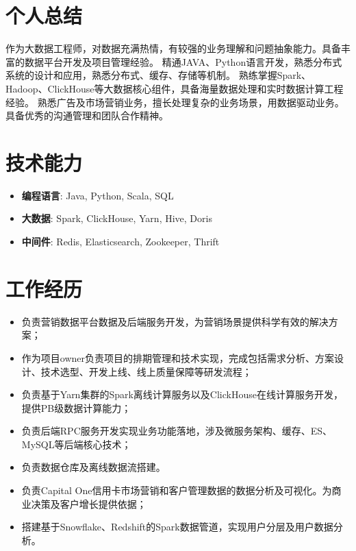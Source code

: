 \documentclass{resume}
\begin{document}

 
\section{个人总结}
作为大数据工程师，对数据充满热情，有较强的业务理解和问题抽象能力。具备丰富的数据平台开发及项目管理经验。
精通JAVA、Python语言开发，熟悉分布式系统的设计和应用，熟悉分布式、缓存、存储等机制。
熟练掌握Spark、Hadoop、ClickHouse等大数据核心组件，具备海量数据处理和实时数据计算工程经验。
熟悉广告及市场营销业务，擅长处理复杂的业务场景，用数据驱动业务。
具备优秀的沟通管理和团队合作精神。

\section{技术能力}
\begin{itemize}[parsep=0.2ex]
  \item \textbf{编程语言}: Java, Python, Scala, SQL
  \item \textbf{大数据}: Spark, ClickHouse, Yarn, Hive, Doris
  \item \textbf{中间件}: Redis, Elasticsearch, Zookeeper, Thrift
\end{itemize}

\section{工作经历}
\begin{itemize}
  \item 负责营销数据平台数据及后端服务开发，为营销场景提供科学有效的解决方案；
  \item 作为项目owner负责项目的排期管理和技术实现，完成包括需求分析、方案设计、技术选型、开发上线、线上质量保障等研发流程；
  \item 负责基于Yarn集群的Spark离线计算服务以及ClickHouse在线计算服务开发，提供PB级数据计算能力；
  \item 负责后端RPC服务开发实现业务功能落地，涉及微服务架构、缓存、ES、MySQL等后端核心技术；
  \item 负责数据仓库及离线数据流搭建。
\end{itemize}

\begin{itemize}
  \item 负责Capital One信用卡市场营销和客户管理数据的数据分析及可视化。为商业决策及客户增长提供依据；
  \item 搭建基于Snowflake、Redshift的Spark数据管道，实现用户分层及用户数据分析。
\end{itemize}
\end{document}
